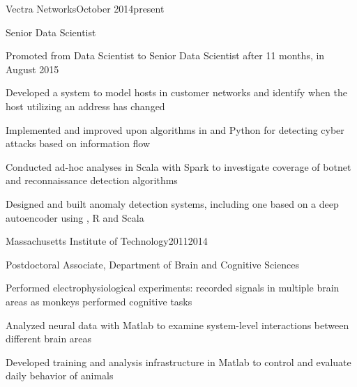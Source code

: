 \documentclass{report}
\begin{document}




  \begin{work_location}{Vectra Networks}{October 2014}{present}

    \begin{position}{Senior Data Scientist}
      \item Promoted from Data Scientist to Senior Data Scientist after 11 months, in August 2015
      \item Developed a system to model hosts in customer networks and identify when the host utilizing an address has changed
      \item Implemented and improved upon algorithms in \CC{} and Python for detecting cyber attacks based on information flow
      \item Conducted ad-hoc analyses in Scala with Spark to investigate coverage of botnet and reconnaissance detection algorithms
      \item Designed and built anomaly detection systems, including one based on a deep autoencoder using \HzO{}, R and Scala
    \end{position}

  \end{work_location}



  \begin{work_location}{Massachusetts Institute of Technology}{2011}{2014}

    \begin{position}{Postdoctoral Associate, Department of Brain and Cognitive Sciences}
      \item {} Performed electrophysiological experiments: recorded signals in multiple brain areas as monkeys performed cognitive tasks
      \item Analyzed neural data with Matlab to examine system-level interactions between different brain areas
      \item Developed training and analysis infrastructure in Matlab to control and evaluate daily behavior of animals
    \end{position}

  \end{work_location}
\end{document}
